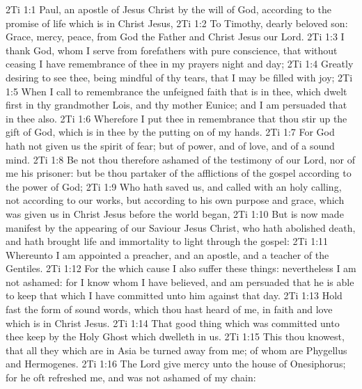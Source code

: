 \vs 2Ti 1:1 Paul, an apostle of Jesus Christ by the will of God, according to the promise of life which is in Christ Jesus,
\vs 2Ti 1:2 To Timothy,  dearly beloved son: Grace, mercy,  peace, from God the Father and Christ Jesus our Lord.
\vs 2Ti 1:3 I thank God, whom I serve from  forefathers with pure conscience, that without ceasing I have remembrance of thee in my prayers night and day;
\vs 2Ti 1:4 Greatly desiring to see thee, being mindful of thy tears, that I may be filled with joy;
\vs 2Ti 1:5 When I call to remembrance the unfeigned faith that is in thee, which dwelt first in thy grandmother Lois, and thy mother Eunice; and I am persuaded that in thee also.
\vs 2Ti 1:6 Wherefore I put thee in remembrance that thou stir up the gift of God, which is in thee by the putting on of my hands.
\vs 2Ti 1:7 For God hath not given us the spirit of fear; but of power, and of love, and of a sound mind.
\vs 2Ti 1:8 Be not thou therefore ashamed of the testimony of our Lord, nor of me his prisoner: but be thou partaker of the afflictions of the gospel according to the power of God;
\vs 2Ti 1:9 Who hath saved us, and called  with an holy calling, not according to our works, but according to his own purpose and grace, which was given us in Christ Jesus before the world began,
\vs 2Ti 1:10 But is now made manifest by the appearing of our Saviour Jesus Christ, who hath abolished death, and hath brought life and immortality to light through the gospel:
\vs 2Ti 1:11 Whereunto I am appointed a preacher, and an apostle, and a teacher of the Gentiles.
\vs 2Ti 1:12 For the which cause I also suffer these things: nevertheless I am not ashamed: for I know whom I have believed, and am persuaded that he is able to keep that which I have committed unto him against that day.
\vs 2Ti 1:13 Hold fast the form of sound words, which thou hast heard of me, in faith and love which is in Christ Jesus.
\vs 2Ti 1:14 That good thing which was committed unto thee keep by the Holy Ghost which dwelleth in us.
\vs 2Ti 1:15 This thou knowest, that all they which are in Asia be turned away from me; of whom are Phygellus and Hermogenes.
\vs 2Ti 1:16 The Lord give mercy unto the house of Onesiphorus; for he oft refreshed me, and was not ashamed of my chain:
